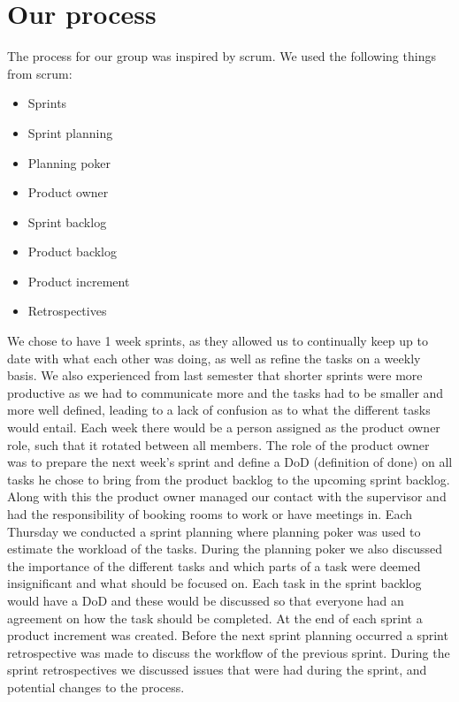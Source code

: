 \section{Our process}
The process for our group was inspired by scrum. We used the following things from scrum:

\begin{itemize}
    \item Sprints 
    \item Sprint planning 
    \item Planning poker 
    \item Product owner 
    \item Sprint backlog 
    \item Product backlog   
    \item Product increment 
    \item Retrospectives 
\end{itemize}

\noindent
We chose to have 1 week sprints, as they allowed us to continually keep up to date with what each other was doing, as well as refine the tasks on a weekly basis.
We also experienced from last semester that shorter sprints were more productive as we had to communicate more and the tasks had to be smaller and more well defined, leading to a lack of confusion as to what the different tasks would entail. 
Each week there would be a person assigned as the product owner role, such that it rotated between all members.
The role of the product owner was to prepare the next week's sprint and define a DoD (definition of done) on all tasks he chose to bring from the product backlog to the upcoming sprint backlog.
Along with this the product owner managed our contact with the supervisor and had the responsibility of booking rooms to work or have meetings in.
Each Thursday we conducted a sprint planning where planning poker was used to estimate the workload of the tasks.
During the planning poker we also discussed the importance of the different tasks and which parts of a task were deemed insignificant and what should be focused on.
Each task in the sprint backlog would have a DoD and these would be discussed so that everyone had an agreement on how the task should be completed.
At the end of each sprint a product increment was created. 
Before the next sprint planning occurred a sprint retrospective was made to discuss the workflow of the previous sprint.
During the sprint retrospectives we discussed issues that were had during the sprint, and potential changes to the process.
